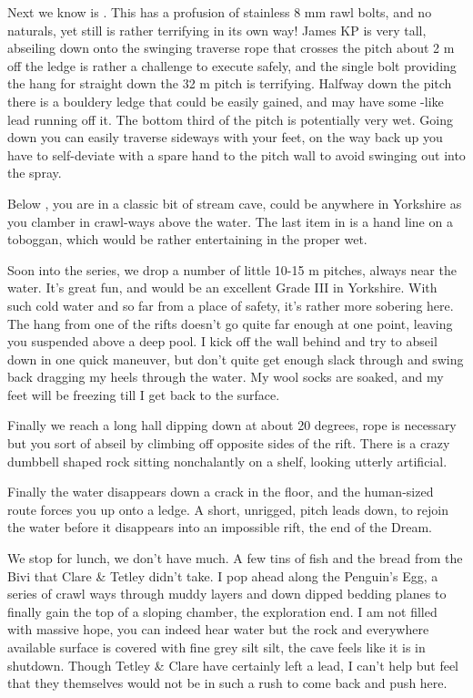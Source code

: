 Next we know is . This has a profusion of stainless 8 mm
rawl bolts, and no naturals, yet still is rather terrifying in its own
way! James KP is very tall, abseiling down onto the swinging traverse
rope that crosses the pitch about 2 m off the ledge is rather a
challenge to execute safely, and the single bolt providing the hang for
straight down the 32 m pitch is terrifying. Halfway down the pitch there
is a bouldery ledge that could be easily gained, and may have some
-like lead running off it. The bottom third of the pitch
is potentially very wet. Going down you can easily traverse sideways
with your feet, on the way back up you have to self-deviate with a spare
hand to the pitch wall to avoid swinging out into the spray.

Below , you are in a classic bit of stream cave, could be
anywhere in Yorkshire as you clamber in crawl-ways above the water. The
last item in  is a hand line on a toboggan, which would
be rather entertaining in the proper wet.

Soon into the  series, we drop a number of little 10-15 m pitches,
always near the water. It's great fun, and would be an excellent Grade
III in Yorkshire. With such cold water and so far from a place of
safety, it's rather more sobering here. The hang from one of the rifts
doesn't go quite far enough at one point, leaving you suspended above a
deep pool. I kick off the wall behind and try to abseil down in one
quick maneuver, but don't quite get enough slack through and swing back
dragging my heels through the water. My wool socks are soaked, and my
feet will be freezing till I get back to the surface.

Finally we reach a long hall dipping down at about 20 degrees, rope is
necessary but you sort of abseil by climbing off opposite sides of the
rift. There is a crazy dumbbell shaped rock sitting nonchalantly on a
shelf, looking utterly artificial.

Finally the water disappears down a crack in the floor, and the
human-sized route forces you up onto a ledge. A short, unrigged, pitch
leads down, to rejoin the water before it disappears into an impossible
rift, the end of the Dream.

We stop for lunch, we don't have much. A few tins of fish and the bread
from the Bivi that Clare \& Tetley didn't take. I pop ahead along the
Penguin's Egg, a series of crawl ways through muddy layers and down
dipped bedding planes to finally gain the top of a sloping chamber, the
exploration end. I am not filled with massive hope, you can indeed hear
water but the rock and everywhere available surface is covered with fine
grey silt silt, the cave feels like it is in shutdown. Though Tetley \&
Clare have certainly left a lead, I can't help but feel that they
themselves would not be in such a rush to come back and push here.

